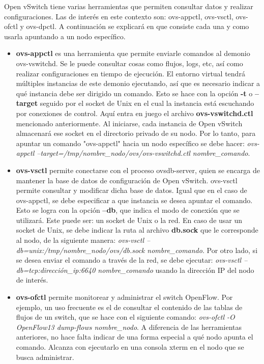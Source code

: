 Open vSwitch tiene varias herramientas que permiten consultar datos y realizar configuraciones. Las de interés en este contexto son: ovs-appctl, ovs-vsctl, ovs-ofctl y ovs-dpctl. A continuación se explicará en que consiste cada una y como usarla apuntando a un nodo específico.
\begin{itemize}
	\item \textbf{ovs-appctl} \cite{ovs-appctl} es una herramienta que permite enviarle comandos al demonio ovs-vswitchd. Se le puede consultar cosas como flujos, logs, etc, así como realizar configuraciones en tiempo de ejecución. El entorno virtual tendrá múltiples instancias de este demonio ejecutando, así que es necesario indicar a qué instancia debe ser dirigido un comando. Esto se hace con la opción \textbf{-t} o \textbf{--target} seguido por el socket de Unix en el cual la instancia está escuchando por conexiones de control. Aquí entra en juego el archivo \textbf{ovs-vswitchd.ctl} mencionado anteriormente. Al iniciarse, cada instancia de Open vSwitch almacenará ese socket en el directorio privado de su nodo. Por lo tanto, para apuntar un comando "ovs-appctl" hacia un nodo específico se debe hacer: \textit{ovs-appctl --target=/tmp/nombre\_nodo/ovs/ovs-vswitchd.ctl nombre\_comando}.
	\item \textbf{ovs-vsctl} \cite{ovs-vsctl} permite conectarse con el proceso ovsdb-server, quien se encarga de mantener la base de datos de configuración de Open vSwitch. ovs-vsctl permite consultar y modificar dicha base de datos. Igual que en el caso de ovs-appctl, se debe especificar a que instancia se desea apuntar el comando. Esto se logra con la opción \textbf{--db}, que indica el modo de conexión que se utilizará. Este puede ser: un socket de Unix o la red. En caso de usar un socket de Unix, se debe indicar la ruta al archivo \textbf{db.sock} que le corresponde al nodo, de la siguiente manera: \textit{ovs-vsctl --db=unix:/tmp/nombre\_nodo/ovs/db.sock nombre\_comando}. Por otro lado, si se desea enviar el comando a través de la red, se debe ejecutar: \textit{ovs-vsctl --db=tcp:dirección\_ip:6640 nombre\_comando} usando la dirección IP del nodo de interés.
	\item \textbf{ovs-ofctl} \cite{ovs-ofctl} permite monitorear y administrar el switch OpenFlow. Por ejemplo, un uso frecuente es el de consultar el contenido de las tablas de flujos de un switch, que se hace con el siguiente comando: \textit{ovs-ofctl -O OpenFlow13 dump-flows nombre\_nodo}. A diferencia de las herramientas anteriores, no hace falta indicar de una forma especial a qué nodo apunta el comando. Alcanza con ejecutarlo en una consola xterm en el nodo que se busca administrar.

\end{itemize}
